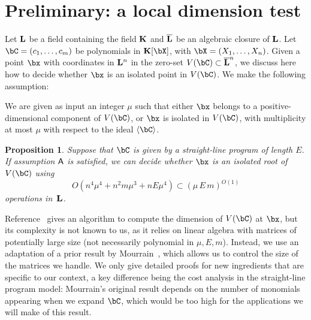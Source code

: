 \documentclass[12pt]{article}
\newtheorem{proposition}[definition]{Proposition}
\begin{document}


\section{Preliminary: a local dimension test} \label{sec:isolated}

Let $\mathbf{L}$ be a field containing the field $\mathbf{K}$ and $\overline{\mathbf{L}}$ be an
algebraic closure of $\mathbf{L}$.  Let $\bC=(c_1,\dots,c_m)$ be polynomials
in $\KK[\bX]$, with $\bX=(X_1,\dots,X_n)$. Given a point $\bx$ with
coordinates in $\mathbf{L}^n$ in the zero-set $V(\bC)\subset \LLbar^n$, we
discuss here how to decide whether $\bx$ is an isolated point in
$V(\bC)$. We make the following assumption:
\begin{description}[leftmargin=*]
\item [$\assH.$] We are given as input an integer $\mu$ such that
 either $\bx$ belongs to a positive-dimensional component of $V(\bC)$,
 or $\bx$ is isolated in $V(\bC)$, with multiplicity at most $\mu$
  with respect to the ideal $\langle \bC\rangle$.
\end{description}

\begin{proposition}\label{prop:testisolated}
  Suppose that $\bC$ is given by a straight-line program of length $E$.
  If assumption $\mathsf{A}$ is satisfied, we can decide whether $\bx$ is an
  isolated root of $V(\bC)$ using 
$$O(n^4 \mu^4 + n^2 m \mu^3 + n E \mu^4) \subset (\mu\,E\,m)^{O(1)}$$ operations in~$\mathbf{L}$.
\end{proposition}
Reference~\cite{BaHaPeSo09} gives an algorithm to compute the
dimension of $V(\bC)$ at $\bx$, but its complexity is not known to us,
as it relies on linear algebra with matrices of potentially large size
(not necessarily polynomial in $\mu,E,m$).  Instead, we use an
adaptation of a prior result by Mourrain~\cite{Mourrain97}, which
allows us to control the size of the matrices we handle. We only give
detailed proofs for new ingredients that are specific to our context,
a key difference being the cost analysis in the straight-line program
model: Mourrain's original result depends on the number of monomials
appearing when we expand $\bC$, which would be too high for the
applications we will make of this result.
\end{document}
